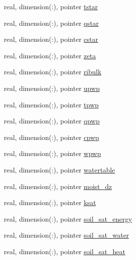 \begin{DoxyCompactItemize}
\item 
real, dimension(\+:), pointer \hyperlink{structed__state__vars_1_1sitetype_ad61f5f0070a1455fcabb7bf18d21defb}{tstar}
\item 
real, dimension(\+:), pointer \hyperlink{structed__state__vars_1_1sitetype_a3e03350fd8351d10a574d27c957bc0b0}{qstar}
\item 
real, dimension(\+:), pointer \hyperlink{structed__state__vars_1_1sitetype_a8f8476bdeb16064ac053d5f067be23bc}{cstar}
\item 
real, dimension(\+:), pointer \hyperlink{structed__state__vars_1_1sitetype_a57f9adc9b703699e68b16649712d0120}{zeta}
\item 
real, dimension(\+:), pointer \hyperlink{structed__state__vars_1_1sitetype_a93bdb32910b72d68f03304f7881aa3d0}{ribulk}
\item 
real, dimension(\+:), pointer \hyperlink{structed__state__vars_1_1sitetype_a8f376382e89663dec877f1629809e537}{upwp}
\item 
real, dimension(\+:), pointer \hyperlink{structed__state__vars_1_1sitetype_a18e7c3758be71afa8c65362c86538e83}{tpwp}
\item 
real, dimension(\+:), pointer \hyperlink{structed__state__vars_1_1sitetype_a26da9e31405a959a191e3c202675e62a}{qpwp}
\item 
real, dimension(\+:), pointer \hyperlink{structed__state__vars_1_1sitetype_a6b392ade4cfa3882afa7dca325c757f7}{cpwp}
\item 
real, dimension(\+:), pointer \hyperlink{structed__state__vars_1_1sitetype_a12e100b115852f06fd1d59d2804f5ff8}{wpwp}
\item 
real, dimension(\+:), pointer \hyperlink{structed__state__vars_1_1sitetype_ac3b535e7324c58fe979b9c57b5d56e45}{watertable}
\item 
real, dimension(\+:), pointer \hyperlink{structed__state__vars_1_1sitetype_abdc641333ff2d0678bb0d304e42b9944}{moist\+\_\+dz}
\item 
real, dimension(\+:), pointer \hyperlink{structed__state__vars_1_1sitetype_a3c65a6accfcd6b0717eada69c50c4a9a}{ksat}
\item 
real, dimension(\+:), pointer \hyperlink{structed__state__vars_1_1sitetype_ac980c9bd2bf9734cb715fec6423e2827}{soil\+\_\+sat\+\_\+energy}
\item 
real, dimension(\+:), pointer \hyperlink{structed__state__vars_1_1sitetype_aa2f6902a4c4fccb542e3d460f17d3793}{soil\+\_\+sat\+\_\+water}
\item 
real, dimension(\+:), pointer \hyperlink{structed__state__vars_1_1sitetype_a0b489cd42c85240f6c60ed2a25699543}{soil\+\_\+sat\+\_\+heat}

\end{DoxyCompactItemize}
